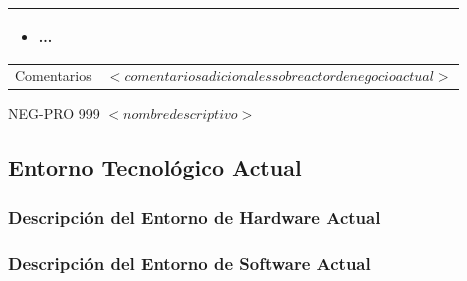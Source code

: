 \begin{Artefacto}[H]
\begin{tabular}{|p{3cm}|p{10cm}|}
\begin{itemize}
\item	... \end{itemize}\\  
         \hline
         \cellcolor{gray30}  Comentarios	&$<comentarios adicionales sobre actor de negocio actual>$\\   
        \hline
  
    \end{tabular}
\caption{NEG-PRO 999	$<nombre descriptivo>$ }
  \end{Artefacto}






\subsection{	Entorno Tecnológico Actual}

 
\subsubsection{	Descripción del Entorno de Hardware Actual}
 
\subsubsection{	Descripción del Entorno de Software Actual}

 
